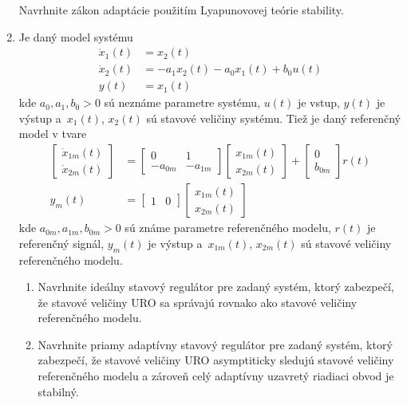 \documentclass[a4paper, 10pt, ]{article}
\begin{document}
\begin{enumerate}[leftmargin=0pt, labelsep=4mm, itemsep=0pt]
    		Navrhnite zákon adaptácie použitím Lyapunovovej teórie stability.






		\item Je daný model systému
		\begin{align*}
			\dot{x}_1(t) &= x_2(t) \\
			\dot{x}_2(t) &= -a_1 x_2(t) - a_0 x_1(t) + b_0 u(t) \\
			y(t) & = x_1(t)
		\end{align*}
		kde $a_0, a_1, b_0 > 0$ sú neznáme parametre systému, $u(t)$ je vstup, $y(t)$ je výstup a~$x_1(t)$, $x_2(t)$ sú stavové veličiny systému. Tiež je daný referenčný model v tvare
		\begin{align*}
			\begin{bmatrix}
				\dot{x}_{1m}(t) \\ \dot{x}_{2m}(t)
			\end{bmatrix}
			&=
			\begin{bmatrix}
				 0 & 1 \\ -a_{0m} & -a_{1m}
			\end{bmatrix}
			\begin{bmatrix}
				 x_{1m}(t)  \\ x_{2m}(t)
			\end{bmatrix}
			+
			\begin{bmatrix}
				 0  \\  b_{0m}
			\end{bmatrix}
			r(t) \\
			y_m(t)
			&=
			\begin{bmatrix}
				 1 & 0
			\end{bmatrix}
			\begin{bmatrix}
				 x_{1m}(t)  \\ x_{2m}(t)
			\end{bmatrix}
		\end{align*}
		kde $a_{0m}, a_{1m}, b_{0m} > 0$ sú známe parametre referenčného modelu, $r(t)$ je referenčný signál, $y_m(t)$ je výstup a~$x_{1m}(t)$, $x_{2m}(t)$ sú stavové veličiny referenčného modelu.


    \begin{enumerate}
    	\item Navrhnite ideálny stavový regulátor pre zadaný systém, ktorý zabezpečí, že stavové veličiny URO sa správajú rovnako ako stavové veličiny referenčného modelu.
    	\item Navrhnite priamy adaptívny stavový regulátor pre zadaný systém, ktorý zabezpečí, že stavové veličiny URO asymptiticky sledujú stavové veličiny referenčného modelu a zároveň celý adaptívny uzavretý riadiaci obvod je stabilný.
    \end{enumerate}







\end{enumerate}
\end{document}
